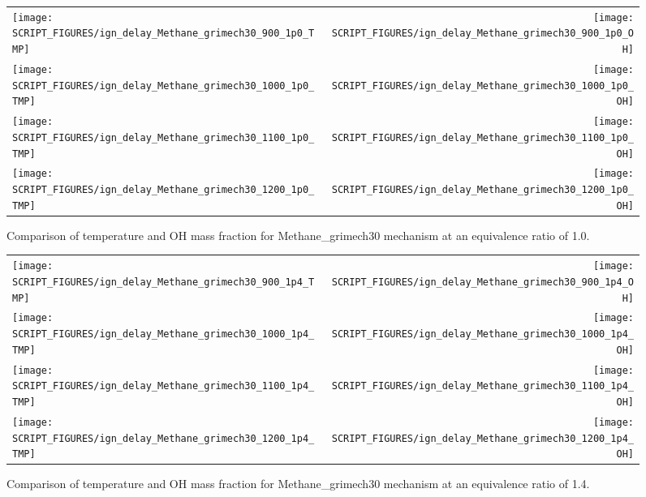 \documentclass[11pt]{book}
\begin{document}
\begin{figure}[p]
\begin{tabular*}{\textwidth}{lr}
\texttt{[image: SCRIPT\_FIGURES/ign\_delay\_Methane\_grimech30\_900\_1p0\_TMP]} &
\texttt{[image: SCRIPT\_FIGURES/ign\_delay\_Methane\_grimech30\_900\_1p0\_OH]} \\
\texttt{[image: SCRIPT\_FIGURES/ign\_delay\_Methane\_grimech30\_1000\_1p0\_TMP]} &
\texttt{[image: SCRIPT\_FIGURES/ign\_delay\_Methane\_grimech30\_1000\_1p0\_OH]} \\
\texttt{[image: SCRIPT\_FIGURES/ign\_delay\_Methane\_grimech30\_1100\_1p0\_TMP]} &
\texttt{[image: SCRIPT\_FIGURES/ign\_delay\_Methane\_grimech30\_1100\_1p0\_OH]} \\
\texttt{[image: SCRIPT\_FIGURES/ign\_delay\_Methane\_grimech30\_1200\_1p0\_TMP]} &
\texttt{[image: SCRIPT\_FIGURES/ign\_delay\_Methane\_grimech30\_1200\_1p0\_OH]}
\end{tabular*}
\caption[Results of the  test cases]{Comparison of temperature and OH mass fraction for Methane\_grimech30 mechanism at an equivalence ratio of 1.0.}
\label{fig:ign_delay_Methane_grimech30_phi_1.0}
\end{figure}

\begin{figure}[p]
\begin{tabular*}{\textwidth}{lr}
\texttt{[image: SCRIPT\_FIGURES/ign\_delay\_Methane\_grimech30\_900\_1p4\_TMP]} &
\texttt{[image: SCRIPT\_FIGURES/ign\_delay\_Methane\_grimech30\_900\_1p4\_OH]} \\
\texttt{[image: SCRIPT\_FIGURES/ign\_delay\_Methane\_grimech30\_1000\_1p4\_TMP]} &
\texttt{[image: SCRIPT\_FIGURES/ign\_delay\_Methane\_grimech30\_1000\_1p4\_OH]} \\
\texttt{[image: SCRIPT\_FIGURES/ign\_delay\_Methane\_grimech30\_1100\_1p4\_TMP]} &
\texttt{[image: SCRIPT\_FIGURES/ign\_delay\_Methane\_grimech30\_1100\_1p4\_OH]} \\
\texttt{[image: SCRIPT\_FIGURES/ign\_delay\_Methane\_grimech30\_1200\_1p4\_TMP]} &
\texttt{[image: SCRIPT\_FIGURES/ign\_delay\_Methane\_grimech30\_1200\_1p4\_OH]}
\end{tabular*}
\caption[Results of the  test cases]{Comparison of temperature and OH mass fraction for Methane\_grimech30 mechanism at an equivalence ratio of 1.4.}
\label{fig:ign_delay_Methane_grimech30_phi_1.4}
\end{figure}
\end{document}
